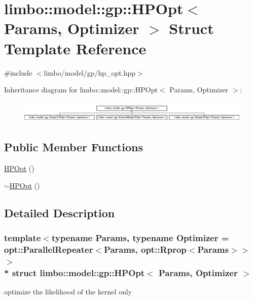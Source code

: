 \hypertarget{structlimbo_1_1model_1_1gp_1_1_h_p_opt}{}\section{limbo\+:\+:model\+:\+:gp\+:\+:H\+P\+Opt$<$ Params, Optimizer $>$ Struct Template Reference}
\label{structlimbo_1_1model_1_1gp_1_1_h_p_opt}


{\ttfamily \#include $<$limbo/model/gp/hp\+\_\+opt.\+hpp$>$}

Inheritance diagram for limbo\+:\+:model\+:\+:gp\+:\+:H\+P\+Opt$<$ Params, Optimizer $>$\+:\begin{figure}[H]
\begin{center}
\leavevmode
\includegraphics[height=1.078998cm]{structlimbo_1_1model_1_1gp_1_1_h_p_opt}
\end{center}
\end{figure}
\subsection*{Public Member Functions}
\begin{DoxyCompactItemize}
\item 
\hyperlink{structlimbo_1_1model_1_1gp_1_1_h_p_opt_a4db24a2480ea1e8600f41515ef9d30cd}{H\+P\+Opt} ()
\item 
\hyperlink{structlimbo_1_1model_1_1gp_1_1_h_p_opt_a9dc7a6a24a0dfccf45e4f88ddab8797d}{$\sim$\+H\+P\+Opt} ()
\end{DoxyCompactItemize}


\subsection{Detailed Description}
\subsubsection*{template$<$typename Params, typename Optimizer = opt\+::\+Parallel\+Repeater$<$\+Params, opt\+::\+Rprop$<$\+Params$>$$>$$>$\\*
struct limbo\+::model\+::gp\+::\+H\+P\+Opt$<$ Params, Optimizer $>$}

optimize the likelihood of the kernel only 


